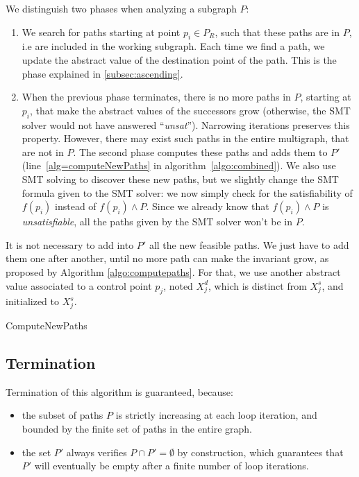 \documentclass[preprint]{sigplanconf}
\begin{document}
We distinguish two phases when analyzing a subgraph $P$:
\begin{enumerate}
\item We search for paths starting at point $p_i \in P_R$, such that these paths
	are in $P$, i.e are included in the working subgraph. Each time we find a
	path, we update the abstract value of the destination point of the path.
	This is the phase explained in \ref{subsec:ascending}.
\item  When the previous phase terminates, there is no more paths in
$P$, starting at $p_i$, 
that make the abstract values of the successors grow (otherwise, the SMT
solver would not have answered ``\emph{unsat}''). Narrowing iterations preserves
this property. 
However, there may exist such paths in the entire multigraph, that are not in
$P$. The second phase
computes these paths and adds them to $P'$ (line~\ref{alg=computeNewPaths} in
algorithm~\ref{algo:combined}). We also use SMT solving to discover
these new paths, but we slightly change the SMT formula given to the SMT solver:
we now simply check for the satisfiability of $f(p_i)$ instead of $f(p_i) \wedge
P$. Since we already know that $f(p_i) \wedge P$ is \emph{unsatisfiable}, all
the paths given by the SMT solver won't be in $P$.
\end{enumerate}

It is not necessary to add into $P'$ all the new feasible paths. We just have
to add them one after another, until no more path can make the invariant grow,
as proposed by Algorithm \ref{algo:computepaths}. For that, we use another
abstract value associated to a control point $p_j$, noted $X_j^d$, which is
distinct from $X_j^s$, and initialized to $X_j^s$.

\begin{algorithm}
	\caption{ComputeNewPaths}
	\label{algo:computepaths}
	\begin{algorithmic}[1] 
	
	\end{algorithmic}
\end{algorithm}

\subsection{Termination}
Termination of this algorithm is guaranteed, because:
\begin{itemize}
\item 
the subset of paths $P$ is
strictly increasing at each loop iteration, and bounded by the finite set of
paths in the entire graph. 
\item the set $P'$ always verifies $P \cap P' = \emptyset$ by construction, 
which guarantees that $P'$
will eventually be empty after a finite number of loop iterations.
\end{itemize}
\end{document}
